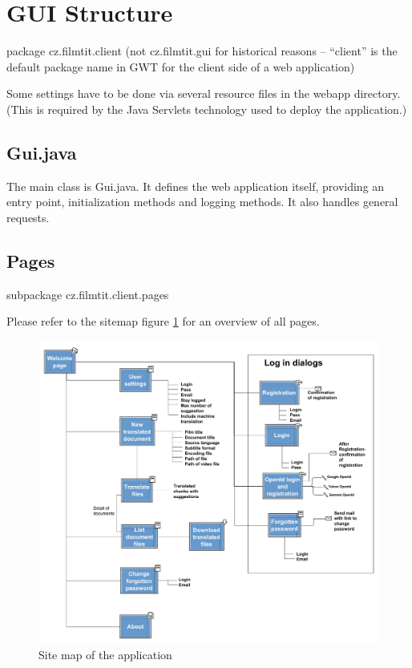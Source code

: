 \section{GUI Structure}

package cz.filmtit.client (not cz.filmtit.gui for historical reasons -- ``client'' is the default package name in GWT for the client side of a web application)

Some settings have to be done via several resource files in the webapp directory. (This is required by the Java Servlets technology used to deploy the application.)


\subsection{Gui.java}

The main class is Gui.java. It defines the web application itself, providing an entry point, initialization methods and logging methods. It also handles general requests.

\subsection{Pages}

subpackage cz.filmtit.client.pages

Please refer to the sitemap figure \ref{fig:sitemap} for an overview of all pages.

\begin{figure}
\begin{center}
\includegraphics[scale=0.4]{figures/sitemap.pdf}
\end{center}
\caption{Site map of the application}
\label{fig:sitemap}
\end{figure}

